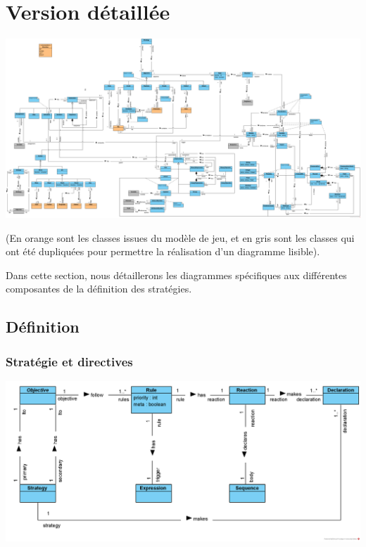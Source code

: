 \documentclass[oneside,a4paper]{book}
\begin{document}
\section{Version détaillée}
\includegraphics[width=.95\textheight,height=\textwidth,keepaspectratio,angle=90,origin=c]{Diagrams/DS-fullversion.png}\newline

(En orange sont les classes issues du modèle de jeu, et en gris sont les classes qui ont été dupliquées pour permettre la réalisation d'un diagramme lisible).\newline

Dans cette section, nous détaillerons les diagrammes spécifiques aux différentes composantes de la définition des stratégies.

\subsection{Définition}

\subsubsection{Stratégie et directives}

\includegraphics[width=\textwidth,height=\textheight,keepaspectratio]{Diagrams/DS-Strategy.png}\newline
\end{document}
